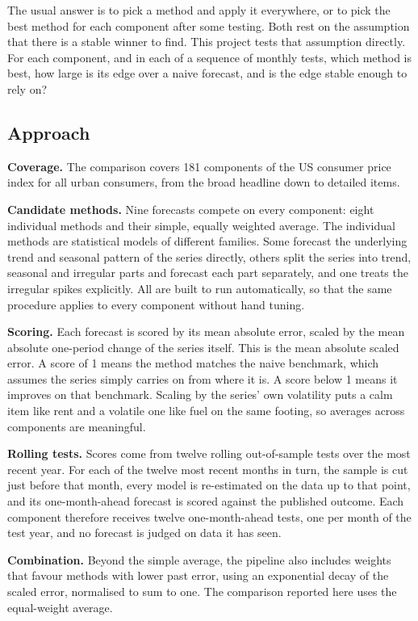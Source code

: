 \documentclass[
  british,
  a4paper,
]{article}
\begin{document}
The usual answer is to pick a method and apply it everywhere, or to pick
the best method for each component after some testing. Both rest on the
assumption that there is a stable winner to find. This project tests
that assumption directly. For each component, and in each of a sequence
of monthly tests, which method is best, how large is its edge over a
naive forecast, and is the edge stable enough to rely on?

\subsection{Approach}\label{approach}

\textbf{Coverage.} The comparison covers 181 components of the US
consumer price index for all urban consumers, from the broad headline
down to detailed items.

\textbf{Candidate methods.} Nine forecasts compete on every component:
eight individual methods and their simple, equally weighted average. The
individual methods are statistical models of different families. Some
forecast the underlying trend and seasonal pattern of the series
directly, others split the series into trend, seasonal and irregular
parts and forecast each part separately, and one treats the irregular
spikes explicitly. All are built to run automatically, so that the same
procedure applies to every component without hand tuning.

\textbf{Scoring.} Each forecast is scored by its mean absolute error,
scaled by the mean absolute one-period change of the series itself. This
is the mean absolute scaled error. A score of 1 means the method matches
the naive benchmark, which assumes the series simply carries on from
where it is. A score below 1 means it improves on that benchmark.
Scaling by the series' own volatility puts a calm item like rent and a
volatile one like fuel on the same footing, so averages across
components are meaningful.

\textbf{Rolling tests.} Scores come from twelve rolling out-of-sample
tests over the most recent year. For each of the twelve most recent
months in turn, the sample is cut just before that month, every model is
re-estimated on the data up to that point, and its one-month-ahead
forecast is scored against the published outcome. Each component
therefore receives twelve one-month-ahead tests, one per month of the
test year, and no forecast is judged on data it has seen.

\textbf{Combination.} Beyond the simple average, the pipeline also
includes weights that favour methods with lower past error, using an
exponential decay of the scaled error, normalised to sum to one. The
comparison reported here uses the equal-weight average.
\end{document}
